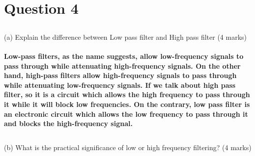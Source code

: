 \documentclass[article]{article}
\begin{document}
\newpage

\section*{Question 4}
\subsection*{}(a) Explain the difference between Low pass filter and High pass filter
(4 marks)
\paragraph{Low-pass filters, as the name suggests, allow low-frequency signals to pass through while attenuating high-frequency signals. On the other hand, high-pass filters allow high-frequency signals to pass through while attenuating low-frequency signals.  If we talk about high pass filter, so it is a circuit which allows the high frequency to pass through it while it will block low frequencies. On the contrary, low pass filter is an electronic circuit which allows the low frequency to pass through it and blocks the high-frequency signal.}
\subsection*{}(b) What is the practical significance of low or high frequency filtering?
(4 marks)
\end{document}
